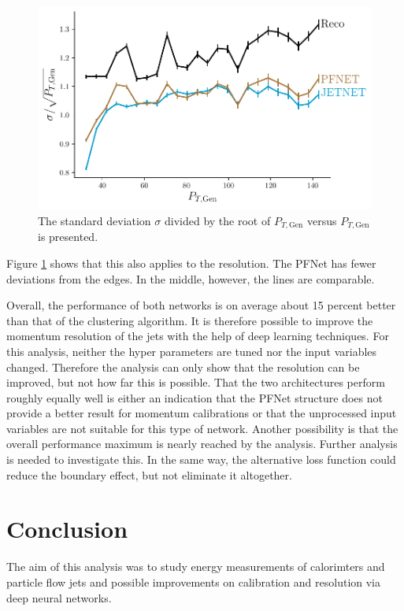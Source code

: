 \documentclass[12pt, a4paper]{thesis}
\begin{document}
\begin{figure}[hbtp]
  \centering
  \includegraphics[width=.9\linewidth]{../images/comp_res.pdf}
  \caption{The standard deviation $\sigma$ divided by the root of \(P_{T, \text{Gen}}\)
    versus \(P_{T, \text{Gen}}\) is presented.}
  \label{comp_res}
\end{figure}

Figure \ref{comp_res} shows that this also applies to the
resolution. The PFNet has fewer deviations from the edges. In the
middle, however, the lines are comparable.

Overall, the performance of both networks is on average about 15
percent better than that of the clustering algorithm.  It is therefore
possible to improve the momentum resolution of the jets with the help
of deep learning techniques.  For this analysis, neither the hyper
parameters are tuned nor the input variables changed. Therefore the
analysis can only show that the resolution can be improved, but not
how far this is possible. That the two architectures perform roughly
equally well is either an indication that the PFNet structure does not
provide a better result for momentum calibrations or that the
unprocessed input variables are not suitable for this type of
network. Another possibility is that the overall performance maximum is
nearly reached by the analysis. Further analysis is needed to
investigate this.  In the same way, the alternative loss function
could reduce the boundary effect, but not eliminate it altogether.


\chapter{Conclusion}
\label{sec:org62a45ca}

The aim of this analysis was to study energy measurements of
calorimters and particle flow jets and possible improvements on
calibration and resolution via deep neural networks.
\end{document}

